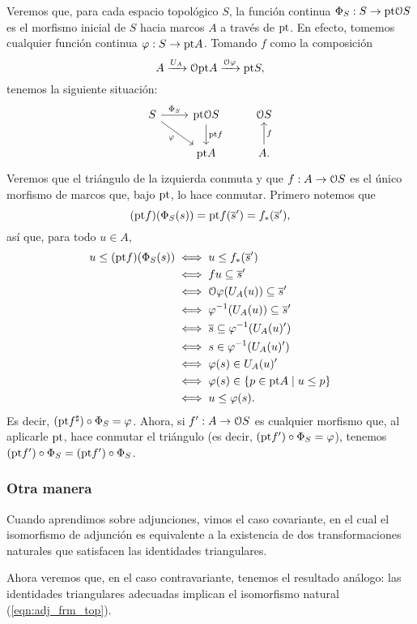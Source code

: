 Veremos que, para cada espacio topológico $S$, la función continua
$\Phi_S:S\to\pt\cal OS$ es el morfismo inicial de $S$ hacia marcos $A$
a través de $\pt$. En efecto, tomemos cualquier función continua
$\phi:S\to \pt A$. Tomando $f$ como la composición
\[
  A\xto{U_A}\cal O\pt A\xto{\cal O\phi}\pt S,
\]
tenemos la siguiente situación:
\[
  \begin{tikzcd}
    S \ar[r,"\Phi_S"] \ar[dr,"\phi"'] & \pt\cal OS \ar[d,"\pt f"] & \cal OS \\
                      & \pt A & A \ar[u,"f"'].
  \end{tikzcd}
\]
Veremos que el triángulo de la izquierda conmuta y que
$f:A\to\cal OS$ es el único morfismo de marcos que, bajo
$\pt$, lo hace conmutar. Primero notemos que
\[
  (\pt f)(\Phi_S(s))
  = \pt f({\ol s}')
  = f_*({\ol s}')
,\]
así que, para todo $u\in A$,
\begin{align*}
  u\leq (\pt f)(\Phi_S(s))
  &\iff u\leq f_*({\ol s}') \\
  &\iff fu \subseteq {\ol s}' \\
  &\iff \cal O\phi(U_A(u)) \subseteq  {\ol s}' \\
  &\iff \phi^{-1}(U_A(u)) \subseteq  {\ol s}' \\
  &\iff \ol s \subseteq \phi^{-1}(U_A(u)') \\
  &\iff s\in \phi^{-1}(U_A(u)') \\
  &\iff \phi(s)\in U_A(u)' \\
  &\iff \phi(s)\in \{p\in\pt A\mid u\leq p\} \\
  &\iff u\leq \phi(s).
\end{align*}
Es decir, $(\pt f^{\sharp})\circ\Phi_S=\phi$.
Ahora, si $f':A\to\cal OS$ es cualquier morfismo que, al aplicarle
$\pt$, hace conmutar el triángulo (es decir, $(\pt
f')\circ\Phi_S=\phi$), tenemos $(\pt f')\circ\Phi_S = (\pt
f')\circ\Phi_S$.

\subsubsection{Otra manera}
\fi

Cuando aprendimos sobre adjunciones,
vimos el caso covariante, en el cual el isomorfismo de
adjunción es equivalente a la existencia de dos transformaciones
naturales que satisfacen las identidades triangulares.

Ahora veremos que, en el caso contravariante,
tenemos el resultado análogo:
las identidades triangulares adecuadas
implican el isomorfismo natural (\ref{eqn:adj_frm_top}).

